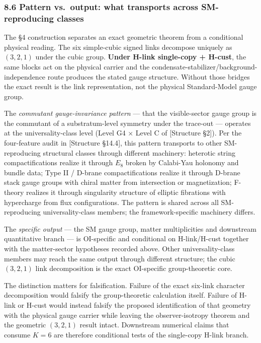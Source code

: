 \documentclass[
]{article}
\begin{document}
\hypertarget{pattern-vs.-output-what-transports-across-sm-reproducing-classes}{%
\subsubsection{8.6 Pattern vs.~output: what transports across
SM-reproducing
classes}\label{pattern-vs.-output-what-transports-across-sm-reproducing-classes}}

The §4 construction separates an exact geometric theorem from a
conditional physical reading. The six simple-cubic signed links
decompose uniquely as \((3,2,1)\) under the cubic group. \textbf{Under
H-link single-copy + H-cust}, the same blocks act on the physical
carrier and the condensate-stabilizer/background-independence route
produces the stated gauge structure. Without those bridges the exact
result is the link representation, not the physical Standard-Model gauge
group.

The \emph{commutant gauge-invariance pattern} --- that the
visible-sector gauge group is the commutant of a substratum-level
symmetry under the trace-out --- operates at the universality-class
level (Level G4 × Level C of {[}Structure §2{]}). Per the four-feature
audit in {[}Structure §14.4{]}, this pattern transports to other
SM-reproducing structural classes through different machinery: heterotic
string compactifications realize it through \(E_8\) broken by Calabi-Yau
holonomy and bundle data; Type II / D-brane compactifications realize it
through D-brane stack gauge groups with chiral matter from intersection
or magnetization; F-theory realizes it through singularity structure of
elliptic fibrations with hypercharge from flux configurations. The
pattern is shared across all SM-reproducing universality-class members;
the framework-specific machinery differs.

The \emph{specific output} --- the SM gauge group, matter multiplicities
and downstream quantitative branch --- is OI-specific and conditional on
H-link/H-cust together with the matter-sector hypotheses recorded above.
Other universality-class members may reach the same output through
different structure; the cubic \((3,2,1)\) link decomposition is the
exact OI-specific group-theoretic core.

The distinction matters for falsification. Failure of the exact six-link
character decomposition would falsify the group-theoretic calculation
itself. Failure of H-link or H-cust would instead falsify the proposed
identification of that geometry with the physical gauge carrier while
leaving the observer-isotropy theorem and the geometric \((3,2,1)\)
result intact. Downstream numerical claims that consume \(K=6\) are
therefore conditional tests of the single-copy H-link branch.
\end{document}
